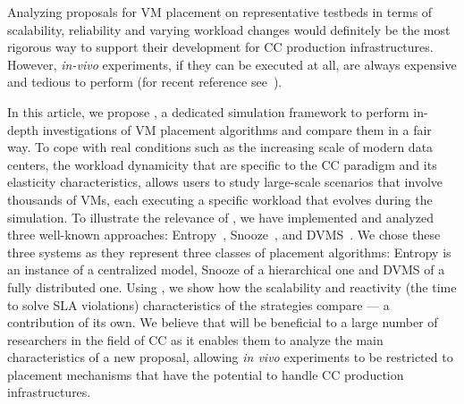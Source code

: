 Analyzing proposals for VM placement on representative testbeds in
terms of scalability, reliability and varying workload changes would
definitely be the most rigorous way to support their development for
CC production infrastructures.
However, \textit{in-vivo} experiments, if they can be
executed at all, are always expensive and tedious to perform (for
recent reference see~\cite{barker:pitfalls}).

In this article, we propose \vmps, a dedicated simulation framework to
perform in-depth investigations of VM placement algorithms and compare
them in a fair way. To cope with real conditions such as the
increasing scale of modern data centers, the workload dynamicity
that are specific to the CC paradigm and its elasticity
characteristics, \vmps allows users to study large-scale scenarios
that involve thousands of VMs,
each executing a specific workload that evolves during the
simulation.
%
To illustrate the relevance of \vmps, we have implemented and analyzed
three well-known approaches:
Entropy~\cite{Hermenier:2009:ECM:1508293.1508300},
Snooze~\cite{feller:ccgrid12}, and DVMS~\cite{quesnel:cpe2012}.
We chose these three systems as they represent three classes of
placement algorithms: Entropy is an instance of a centralized model,
Snooze of a hierarchical one and DVMS of a fully distributed one.
Using \vmps, we show how the scalability and reactivity (\ie the time
to solve SLA violations) characteristics of the strategies compare ---
a contribution of its own.  %
%
We believe that \vmps will be beneficial to a large number of
researchers in the field of CC as it enables them to analyze the main
characteristics of a new proposal, allowing \textit{in vivo}
experiments to be restricted to placement mechanisms that have the
potential to handle CC production infrastructures.


